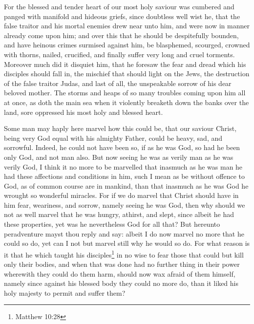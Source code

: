 \documentclass[a5paper]{scrbook}
\begin{document}
	 For the blessed and tender heart of our most holy saviour was cumbered and panged with manifold and hideous griefs, since doubtless well wist he, that the false traitor and his mortal enemies drew near unto him, and were now in manner already come upon him; and over this that he should be despitefully bounden, and have heinous crimes surmised against him, be blasphemed, scourged, crowned with thorns, nailed, crucified, and finally suffer very long and cruel torments. Moreover much did it disquiet him, that he foresaw the fear and dread which his disciples should fall in, the mischief that should light on the Jews, the destruction of the false traitor Judas, and last of all, the unspeakable sorrow of his dear beloved mother. The storms and heaps of so many troubles coming upon him all at once, as doth the main sea when it violently breaketh down the banks over the land, sore oppressed his most holy and blessed heart.
	
	Some man may haply here marvel how this could be, that our saviour Christ, being very God equal with his almighty Father, could be heavy, sad, and sorrowful. Indeed, he could not have been so, if as he was God, so had he been only God, and not man also. But now seeing he was as verily man as he was verily God, I think it no more to be marvelled that inasmuch as he was man he had these affections and conditions in him, such I mean as be without offence to God, as of common course are in mankind, than that inasmuch as he was God he wrought so wonderful miracles. For if we do marvel that Christ should have in him fear, weariness, and sorrow, namely seeing he was God, then why should we not as well marvel that he was hungry, athirst, and slept, since albeit he had these properties, yet was he nevertheless God for all that? But hereunto peradventure mayst thou reply and say: albeit I do now marvel no more that he could so do, yet can I not but marvel still why he would so do. For what reason is it that he which taught his disciples\footnote{Matthew 10:28} in no wise to fear those that could but kill only their bodies, and when that was done had no further thing in their power wherewith they could do them harm, should now wax afraid of them himself, namely since against his blessed body they could no more do, than it liked his holy majesty to permit and suffer them?
	
\end{document}

